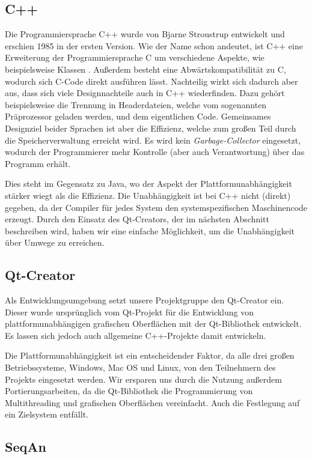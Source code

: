 \subsection{C++}
Die Programmiersprache C++ wurde von Bjarne Stroustrup entwickelt und erschien 1985 in der ersten Version.
Wie der Name schon andeutet, ist C++ eine Erweiterung der Programmiersprache C um verschiedene Aspekte, wie beispielsweise Klassen \citep{Stroustrup1996}.
Außerdem besteht eine Abwärtskompatibilität zu C, wodurch sich C-Code direkt ausführen lässt.
Nachteilig wirkt sich dadurch aber aus, dass sich viele Designnachteile auch in C++ wiederfinden.
Dazu gehört beispielsweise die Trennung in Headerdateien, welche vom sogenannten Präprozessor geladen werden, und dem eigentlichen Code.
Gemeinsames Designziel beider Sprachen ist aber die Effizienz, welche zum großen Teil durch die Speicherverwaltung erreicht wird.
Es wird kein \textit{Garbage-Collector} eingesetzt, wodurch der Programmierer mehr Kontrolle (aber auch Verantwortung) über das Programm erhält.

Dies steht im Gegensatz zu Java, wo der Aspekt der Plattformunabhängigkeit stärker wiegt als die Effizienz.
Die Unabhängigkeit ist bei C++ nicht (direkt) gegeben, da der Compiler für jedes System den systemspezifischen Maschinencode erzeugt.
Durch den Einsatz des Qt-Creators, der im nächsten Abschnitt beschreiben wird, haben wir eine einfache Möglichkeit, um die Unabhängigkeit über Umwege zu erreichen.

\subsection{Qt-Creator}
Als Entwicklungsumgebung setzt unsere Projektgruppe den Qt-Creator ein.
Dieser wurde ursprünglich vom Qt-Projekt für die Entwicklung von plattformunabhängigen grafischen Oberflächen mit der Qt-Bibliothek entwickelt.
Es lassen sich jedoch auch allgemeine C++-Projekte damit entwickeln.

Die Plattformunabhängigkeit ist ein entscheidender Faktor, da alle drei großen Betriebssysteme, Windows, Mac OS und Linux, von den Teilnehmern des Projekts eingesetzt werden.
Wir ersparen uns durch die Nutzung außerdem Portierungsarbeiten, da die Qt-Bibliothek die Programmierung von Multithreading und grafischen Oberflächen vereinfacht.
Auch die Festlegung auf ein Zielsystem entfällt.

\subsection{SeqAn}

